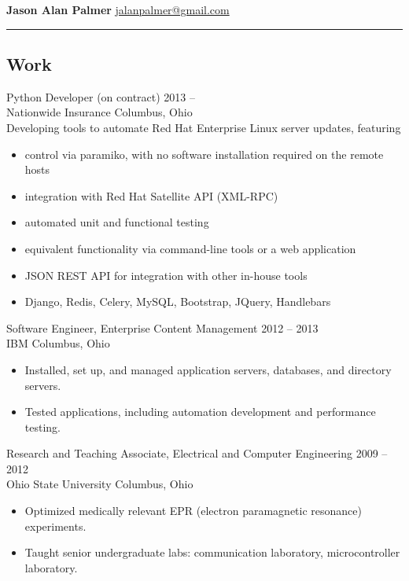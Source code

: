 \documentclass[12pt]{report}
\begin{document}
\textbf{\large Jason Alan Palmer} \hfill \href{mailto:jalanpalmer@gmail.com}{jalanpalmer@gmail.com}

\rule{\textwidth}{1pt}

\subsection*{Work}

Python Developer (on contract) \hfill 2013 -- ~~~~~~ \\
Nationwide Insurance           \hfill Columbus, Ohio \\
Developing tools to automate Red Hat Enterprise Linux server updates, featuring
\begin{itemize}
\item control via paramiko, with no software installation required on the remote hosts
\item integration with Red Hat Satellite API (XML-RPC)
\item automated unit and functional testing
\item equivalent functionality via command-line tools or a web application
\item JSON REST API for integration with other in-house tools
\item Django, Redis, Celery, MySQL, Bootstrap, JQuery, Handlebars
\\
\end{itemize}

Software Engineer, Enterprise Content Management \hfill 2012 -- 2013 \\
IBM                                              \hfill Columbus, Ohio
\begin{itemize}
\item Installed, set up, and managed application servers, databases, and directory servers.
\item Tested applications, including automation development and performance testing.
\\
\end{itemize}

Research and Teaching Associate, Electrical and Computer Engineering \hfill 2009 -- 2012 \\
Ohio State University                                                \hfill Columbus, Ohio
\begin{itemize}
\item Optimized medically relevant EPR (electron paramagnetic resonance) experiments.
\item Taught senior undergraduate labs: communication laboratory, microcontroller laboratory.
\\
\end{itemize}
\end{document}
